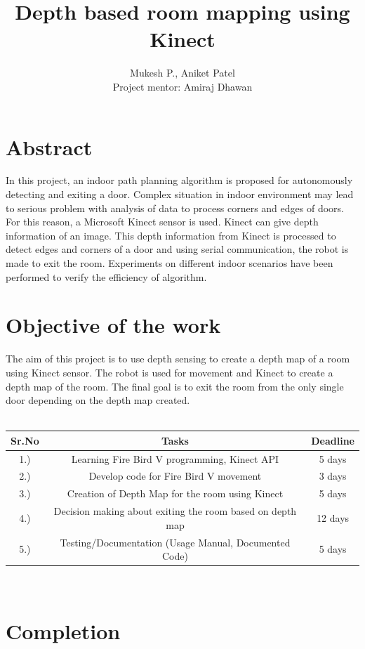 \documentclass{report}
\author{Mukesh P., Aniket Patel \\ Project mentor: Amiraj Dhawan}
\title{Depth based room mapping using Kinect}
\begin{document}
\maketitle
\tableofcontents


\chapter{Abstract}
In this project, an indoor path planning algorithm is proposed for autonomously detecting and exiting a door. Complex situation in indoor
environment may lead to serious problem with analysis of data to process corners and edges of doors. For this reason, a Microsoft Kinect sensor is used.
Kinect can give depth information of an image. This depth information from Kinect is processed to detect edges and corners of a door and using serial
communication, the robot is made to exit the room. Experiments on different indoor scenarios have been performed
to verify the efficiency of algorithm.
\chapter{Objective of the work}
The aim of this project is to use depth sensing to create a depth map of a room using Kinect sensor. The robot is used for movement and
Kinect to create a depth map of the room. The final goal is to exit the room from the only single door depending on the depth map created. \\ \\

\begin{tabular}{ | c | c | c |}
	\hline\hline
	\bf Sr.No & \bf Tasks & \bf Deadline \\ 
	\hline
	1.) & Learning Fire Bird V programming, Kinect API & 5 days \\
	\hline
	2.) & Develop code for Fire Bird V movement & 3 days \\
	\hline
	3.) & Creation of Depth Map for the room using Kinect & 5 days \\
	\hline
	4.) & Decision making about exiting the room based on depth map & 12 days\\
	\hline
	5.) & Testing/Documentation (Usage Manual, Documented Code) & 5 days
	\\ \hline

\end{tabular} \\

\chapter{Completion}
\end{document}
